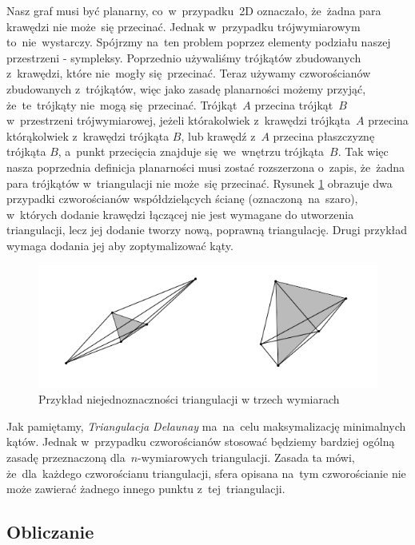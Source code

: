 \documentclass[skorowidz,autorrok,backref,xodstep,oswiadczenie]{wmimgr}
\begin{document}
Nasz graf musi być planarny, co~w~przypadku~2D oznaczało, że~żadna para krawędzi nie może~się przecinać. Jednak w~przypadku trójwymiarowym to~nie~wystarczy. Spójrzmy na~ten problem poprzez elementy podziału naszej przestrzeni - sympleksy. Poprzednio używaliśmy trójkątów zbudowanych z~krawędzi, które nie~mogły się~przecinać. Teraz używamy czworościanów zbudowanych z~trójkątów, więc jako zasadę planarności możemy przyjąć, że~te~trójkąty nie~mogą się~przecinać. Trójkąt~$A$ przecina trójkąt~$B$ w~przestrzeni trójwymiarowej, jeżeli którakolwiek z~krawędzi trójkąta~$A$ przecina którąkolwiek z~krawędzi trójkąta $B$, lub krawędź z~$A$ przecina płaszczyznę trójkąta $B$, a~punkt przecięcia znajduje się~we~wnętrzu trójkąta~$B$. Tak więc nasza poprzednia definicja planarności musi zostać rozszerzona o~zapis, że~żadna para trójkątów w~triangulacji nie może~się przecinać. Rysunek \ref{triangulation3d} obrazuje dwa przypadki czworościanów współdzielących ścianę (oznaczoną~na~szaro), w~których dodanie krawędzi łączącej nie jest wymagane do utworzenia triangulacji, lecz jej dodanie tworzy nową, poprawną triangulację. Drugi przykład wymaga dodania jej aby zoptymalizować kąty.

\begin{figure}[ht!]
\centering
\includegraphics[width=150mm]{images/triangulacja_3d.png}
\caption{Przykład niejednoznaczności triangulacji w trzech wymiarach}
\label{triangulation3d}
\end{figure}

Jak pamiętamy, \emph{Triangulacja Delaunay} ma~na~celu maksymalizację minimalnych kątów. Jednak w~przypadku czworościanów stosować będziemy bardziej ogólną zasadę przeznaczoną dla~$n$-wymiarowych triangulacji. Zasada ta mówi, że~dla~każdego czworościanu triangulacji, sfera opisana na~tym czworościanie nie może zawierać żadnego innego punktu z~tej~triangulacji.

\subsection{Obliczanie}
\end{document}
